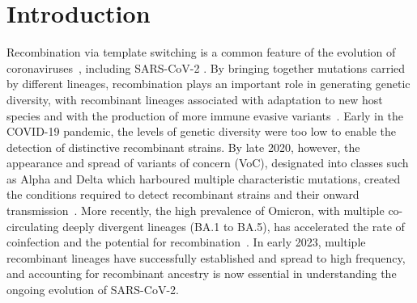 \documentclass{article}
\begin{document}
\section{Introduction}
Recombination via template switching is a common feature
of the evolution of coronaviruses~\citep{Graham2010-xe,De_Klerk2022-tt},
including SARS-CoV-2
\citep{VanInsberghe2021-eu,Jackson2021-ik,Ignatieva2022-st}. By bringing
together mutations carried by different lineages, recombination plays an
important role in generating genetic diversity, with recombinant lineages
associated with adaptation to new host species and with the production of more
immune evasive variants~\citep{Graham2010-xe,De_Klerk2022-tt,Tamura2023-ab}.
Early in the COVID-19 pandemic, the levels of genetic diversity
were too low to enable the detection of distinctive recombinant strains.
By late 2020, however, the appearance and
spread of variants of concern (VoC), designated into classes such as Alpha and
Delta which harboured multiple characteristic mutations,
created the conditions required to detect
recombinant strains and their onward transmission~\citep{Jackson2021-ik}.
More recently, the high prevalence of Omicron,
with multiple co-circulating deeply divergent lineages (BA.1 to BA.5), has
accelerated the rate of coinfection and the potential for
recombination~\citep{Bal2022-hq}.
In early 2023, multiple recombinant lineages have successfully
established and spread to high frequency, and accounting for recombinant
ancestry is now essential in understanding the ongoing evolution of SARS-CoV-2.
\end{document}
